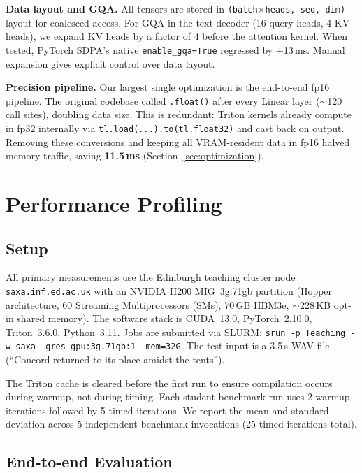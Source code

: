 \documentclass{article}
\begin{document}
\textbf{Data layout and GQA.}
All tensors are stored in \texttt{(batch$\times$heads, seq, dim)} layout for coalesced access.  For GQA in the text decoder (16 query heads, 4 KV heads), we expand KV heads by a factor of 4 before the attention kernel.  When tested, PyTorch SDPA's native \texttt{enable\_gqa=True} regressed by +13\,ms. Manual expansion gives explicit control over data layout.

\textbf{Precision pipeline.}
Our largest single optimization is the end-to-end fp16 pipeline.
The original codebase called \texttt{.float()} after every Linear layer ($\sim$120 call sites), doubling data size.  This is redundant: Triton kernels already compute in fp32 internally via \texttt{tl.load(...).to(tl.float32)} and cast back on output.
Removing these conversions and keeping all VRAM-resident data in fp16 halved memory traffic, saving \textbf{11.5\,ms} (Section~\ref{sec:optimization}).

\section{Performance Profiling}\label{sec:profiling}

\subsection{Setup}

All primary measurements use the Edinburgh teaching cluster node \texttt{saxa.inf.ed.ac.uk} with an NVIDIA H200 MIG~3g.71gb partition (Hopper architecture, 60 Streaming Multiprocessors (SMs), 70\,GB HBM3e, $\sim$228\,KB opt-in shared memory).
The software stack is CUDA~13.0, PyTorch~2.10.0, Triton~3.6.0, Python~3.11.
Jobs are submitted via SLURM: \texttt{srun -p Teaching -w saxa --gres gpu:3g.71gb:1 --mem=32G}.
The test input is a 3.5\,s WAV file (``Concord returned to its place amidst the tents'').

The Triton cache is cleared before the first run to ensure compilation occurs during warmup, not during timing.
Each student benchmark run uses 2 warmup iterations followed by 5 timed iterations.  We report the mean and standard deviation across 5 independent benchmark invocations (25 timed iterations total).

\subsection{End-to-end Evaluation}
\end{document}

